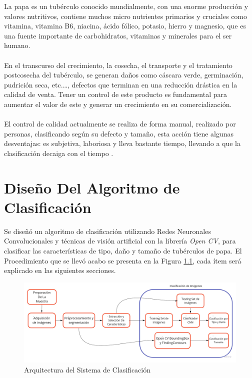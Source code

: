 La papa es un tubérculo conocido mundialmente, con una enorme producción y valores nutritivos, contiene muchos micro nutrientes primarios y cruciales como vitamina, vitamina B6, niacina, ácido fólico, potasio, hierro y magnesio, que es una fuente importante de carbohidratos, vitaminas y minerales para el ser humano.\\
\\
En el transcurso del crecimiento, la cosecha, el transporte y el tratamiento postcosecha del tubérculo, se generan daños como cáscara verde, germinación, pudrición seca, etc.…, defectos que terminan en una reducción drástica en la calidad de venta. Tener un control de este producto es fundamental para aumentar el valor de este y generar un crecimiento en su comercialización.\\
\\
El control de calidad actualmente se realiza de forma manual, realizado por personas, clasificando según su defecto y tamaño, esta acción tiene algunas desventajas: es subjetiva, laboriosa y lleva bastante tiempo, llevando a que la clasificación decaiga con el tiempo \cite{refjaither}.



\chapter{Diseño Del Algoritmo de Clasificación}


Se diseñó un algoritmo de clasificación utilizando Redes Neuronales Convolucionales y técnicas de visión artificial con la librería \textit{Open CV}, para clasificar las características de tipo, daño y tamaño de tubérculos de papa. El Procedimiento que se llevó acabo se presenta en la Figura \ref{fig:flujogeneral}, cada ítem será explicado en las siguientes secciones. 


\begin{figure}[ht]
	\centering
	\includegraphics[scale=0.3]{Figs/FGGeneral.jpg}
	\caption{Arquitectura del Sistema de Clasificación}
	\label{fig:flujogeneral}
\end{figure}

